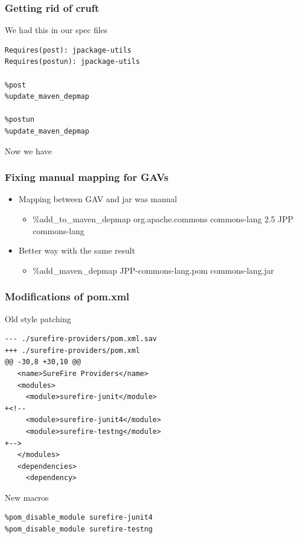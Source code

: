 \documentclass[pdftex,unicode,xcolor=table]{beamer}
\begin{document}
\begin{frame}[fragile]
  \frametitle{Getting rid of cruft}
  \scriptsize
  \begin{block}{We had this in our spec files}
  \begin{verbatim}
Requires(post): jpackage-utils
Requires(postun): jpackage-utils

%post
%update_maven_depmap

%postun
%update_maven_depmap
\end{verbatim}
\end{block}
\begin{block}{Now we have}
\end{block}
\end{frame}



\begin{frame}[fragile]
  \frametitle{Fixing manual mapping for GAVs}
  \begin{itemize}
    \item Mapping between GAV and jar was manual
      \begin{itemize}
      \item \%add\_to\_maven\_depmap org.apache.commons commons-lang 2.5 JPP commons-lang
      \end{itemize}
    \item Better way with the same result
      \begin{itemize}
      \item \%add\_maven\_depmap JPP-commons-lang.pom commons-lang.jar
      \end{itemize}
  \end{itemize}
\end{frame}


\begin{frame}[fragile]
  \scriptsize
\frametitle{Modifications of pom.xml}
  \begin{block}{Old style patching}
\begin{verbatim}
--- ./surefire-providers/pom.xml.sav
+++ ./surefire-providers/pom.xml
@@ -30,8 +30,10 @@
   <name>SureFire Providers</name>
   <modules>
     <module>surefire-junit</module>
+<!--
     <module>surefire-junit4</module>
     <module>surefire-testng</module>
+-->
   </modules>
   <dependencies>
     <dependency>
\end{verbatim}
\end{block}

  \begin{block}{New macros}
\begin{verbatim}
%pom_disable_module surefire-junit4
%pom_disable_module surefire-testng
\end{verbatim}
\end{block}
\end{frame}
\end{document}
